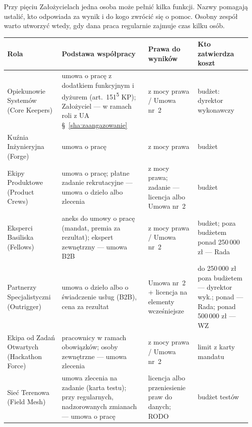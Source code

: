 \documentclass[11pt,a4paper]{report}
\newcommand{\UA}[1]{UA §~#1}
\begin{document}
Przy pięciu Założycielach jedna osoba może pełnić kilka funkcji. Nazwy pomagają ustalić, kto odpowiada za wynik i do kogo zwrócić się o pomoc. Osobny zespół warto utworzyć wtedy, gdy dana praca regularnie zajmuje czas kilku osób.

\begin{center}
\small
\begin{tabularx}{\linewidth}{@{}>{\raggedright\arraybackslash}p{3.0cm} >{\raggedright\arraybackslash}X >{\raggedright\arraybackslash}p{3.6cm} >{\raggedright\arraybackslash}p{3.0cm}@{}}
\toprule
\textbf{Rola} & \textbf{Podstawa współpracy} & \textbf{Prawa do wyników} & \textbf{Kto zatwierdza koszt} \\
\midrule
Opiekunowie Systemów (Core Keepers) & umowa o pracę z dodatkiem funkcyjnym i dyżurem (art.~151\textsuperscript{5} KP); Założyciel --- w ramach roli z \UA{\ref{sha:zaangazowanie}} & z mocy prawa / Umowa nr~2 & budżet: dyrektor wykonawczy \\
Kuźnia Inżynieryjna (Forge) & umowa o pracę & z mocy prawa & budżet \\
Ekipy Produktowe (Product Crews) & umowa o pracę; płatne zadanie rekrutacyjne --- umowa o dzieło albo zlecenia & z mocy prawa; zadanie --- licencja albo Umowa nr~2 & budżet \\
Eksperci Basiliska (Fellows) & aneks do umowy o pracę (mandat, premia za rezultat); ekspert zewnętrzny --- umowa B2B & z mocy prawa / Umowa nr~2 & budżet; poza budżetem ponad 250\,000 zł --- Rada \\
Partnerzy Specjalistyczni (Outrigger) & umowa o dzieło albo o świadczenie usług (B2B), cena za rezultat & Umowa nr~2 + licencja na elementy wcześniejsze & do 250\,000 zł poza budżetem --- dyrektor wyk.; ponad --- Rada; ponad 500\,000 zł --- WZ \\
Ekipa od Zadań Otwartych (Hackathon Force) & pracownicy w ramach obowiązków; osoby zewnętrzne --- umowa zlecenia & z mocy prawa / Umowa nr~2 & limit z karty mandatu \\
Sieć Terenowa (Field Mesh) & umowa zlecenia na zadanie (karta testu); przy regularnych, nadzorowanych zmianach --- umowa o pracę & licencja albo przeniesienie praw do danych; RODO & budżet testów \\
\bottomrule
\end{tabularx}
\end{center}
\end{document}

